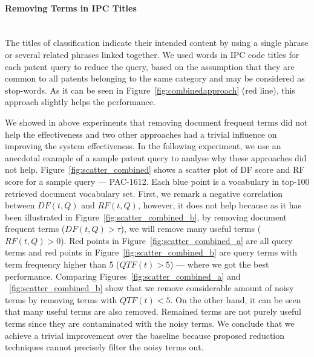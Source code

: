 \paragraph{Removing Terms in IPC Titles}
\ \\
The titles of classification indicate their intended content by using a single phrase or several related phrases linked together. We used words in IPC code titles for each patent query to reduce the query, based on the assumption that they are common to all patents belonging to the same category and may be considered as stop-words. As it can be seen in Figure~\ref{fig:combinedapproach} (red line), this approach slightly helps the performance.

We showed in above experiments that removing document frequent terms did not help the effectiveness and 
two other approaches had a trivial influence on improving the system effectiveness. 
In the following experiment, we use an anecdotal example of a sample patent query to analyse why these approaches did not help. 
Figure~\ref{fig:scatter_combined} shows a scatter plot of DF score and RF score for a sample query --- PAC-1612. Each blue point is a vocabulary in top-100 retrieved document vocabulary set. First, we remark a negative correlation between $\mathit{DF(t, Q)}$ and $\mathit{RF(t, Q)}$, however, it does not help because as it has been illustrated in Figure~\ref{fig:scatter_combined_b}, by removing document frequent terms ($DF(t, Q)>\tau$), we will remove many useful terms ($RF(t, Q)>0$). Red points in Figure~\ref{fig:scatter_combined_a} are all query terms and red points in Figure~\ref{fig:scatter_combined_b} are query terms with term frequency higher than 5 ($QTF(t)>5$) --- where we got the best performance. 
Comparing Figures~\ref{fig:scatter_combined_a} and ~\ref{fig:scatter_combined_b} show that we remove considerable amount of noisy terms by removing terms with $QTF(t)<5$. 
On the other hand, it can be seen that many useful terms are also removed. Remained terms are not purely useful terms since they are contaminated with the noisy terms. We conclude that we achieve a trivial improvement over the baseline because proposed reduction techniques cannot precisely filter the noisy terms out. 
